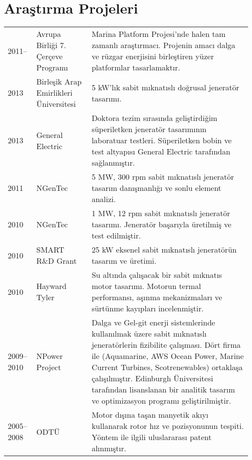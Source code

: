 \documentclass[a4paper,12pt]{article}
\begin{document}
\section{Araştırma Projeleri}
\begin{longtable}{lp{3cm}p{12cm}}
2011-- & Avrupa Birliği 7. Çerçeve Programı & Marina Platform Projesi'nde halen tam zamanlı araştırmacı. Projenin amacı dalga ve rüzgar enerjisini birleştiren yüzer platformlar tasarlamaktır.\\
2013 & Birleşik Arap Emirlikleri Üniversitesi & 5 kW'lık sabit mıknatıslı doğrusal jeneratör tasarımı.\\
2013 & General Electric & Doktora tezim sırasında geliştirdiğim süperiletken jeneratör tasarımının laboratuar testleri. Süperiletken bobin ve test altyapısı General Electric tarafından sağlanmıştır.\\
2011 & NGenTec & 5 MW, 300 rpm sabit mıknatıslı jeneratör tasarım danışmanlığı ve sonlu element analizi.\\
2010 & NGenTec & 1 MW, 12 rpm sabit mıknatıslı jeneratör tasarımı. Jeneratör başarıyla üretilmiş ve test edilmiştir.\\
2010 & SMART R\&D Grant & 25 kW eksenel sabit mıknatıslı jeneratörün tasarım ve üretimi.\\
2010 & Hayward Tyler & Su altında çalışacak bir sabit mıknatıs motor tasarımı. Motorun termal performansı, aşınma mekanizmaları ve sürtünme kayıpları incelenmiştir.\\
2009--2010 & NPower Project & Dalga ve Gel-git enerji sistemlerinde kullanılmak üzere sabit mıknatıslı jeneratörlerin fizibilite çalışması. Dört firma ile (Aquamarine, AWS Ocean Power, Marine Current Turbines, Scotrenewables) ortaklaşa çalışılmıştır. Edinburgh Üniversitesi tarafından lisanslanan bir analitik tasarım ve optimizasyon programı geliştirilmiştir.\\
2005--2008 & ODTÜ & Motor dışına taşan manyetik akıyı kullanarak rotor hız ve pozisyonunun tespiti. Yöntem ile ilgili uluslararası patent alınmıştır.\\
\end{longtable}


\end{document}
